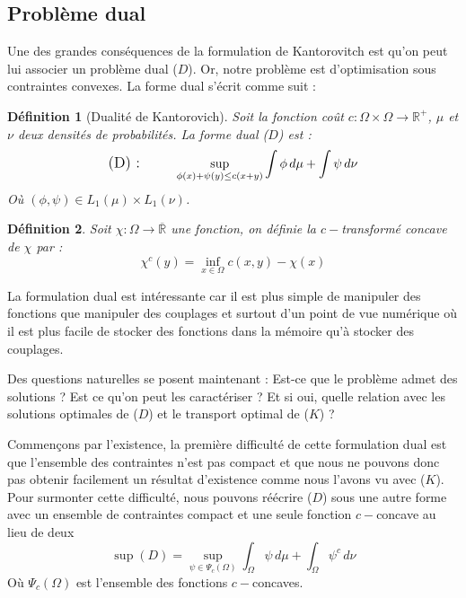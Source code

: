 \documentclass[
    8.2pt,
    a4paper,
    logo,
    twocolumn
]{template}
\newtheorem{definition}{Définition}
\begin{document}
    \subsection{Problème dual}\label{sec:dual}
    Une des grandes conséquences de la formulation de Kantorovitch est qu’on peut lui associer un problème dual ($D$).
    Or, notre problème est d'optimisation sous contraintes convexes. La forme dual s'écrit comme suit :
    \begin{definition}[Dualité de Kantorovich]\label{th:dual-k}
        Soit la fonction coût $c : \Omega \times \Omega \rightarrow \mathbb{R}^+$, $\mu$ et $\nu$ deux densités de probabilités. La forme dual ($D$) est :
        \begin{align*}
            \text{\large{(D) : \qquad}} &
            \sup_{\phi(x) + \psi(y) \leq c(x+y)} \int \phi \,d\mu + \int \psi \,d\nu \\
        \end{align*}
        Où $(\phi,\psi) \in L_1(\mu) \times L_1(\nu)$.
    \end{definition}

    \begin{definition}
        Soit $\chi : \Omega \rightarrow \overline{\mathbb{R}}$ une fonction, on définie la $c-$transformé concave de $\chi$ par :
        \[
            \chi^c(y) = \inf_{x \in \Omega} c(x,y) - \chi(x)
        \]
    \end{definition}

    La formulation dual est intéressante car il est plus simple de manipuler des fonctions que manipuler des couplages et surtout d’un point de vue numérique où il est plus facile de stocker des fonctions dans la mémoire qu’à stocker des couplages.

    Des questions naturelles se posent maintenant : Est-ce que le problème admet des solutions ? Est ce qu’on peut les caractériser ? Et si oui, quelle relation avec les solutions optimales de ($D$) et le transport optimal de ($K$) ?

    Commençons par l’existence, la première difficulté de cette formulation dual est que l'ensemble des contraintes n'est pas compact et que nous ne pouvons donc pas obtenir facilement un résultat d'existence comme nous l'avons vu avec ($K$). \\
    Pour surmonter cette difficulté, nous pouvons réécrire ($D$) sous une autre forme avec un ensemble de contraintes compact et une seule fonction $c-$concave au lieu de deux
    \begin{equation} \label{eq:formulation}
        \sup(D) = \sup_{\psi \in \Psi_c(\Omega)} \int_{\Omega} \psi \,d\mu + \int_{\Omega} \psi^c \,d\nu
    \end{equation}
    Où $\Psi_c(\Omega)$ est l'ensemble des fonctions $c-$concaves.
\end{document}
